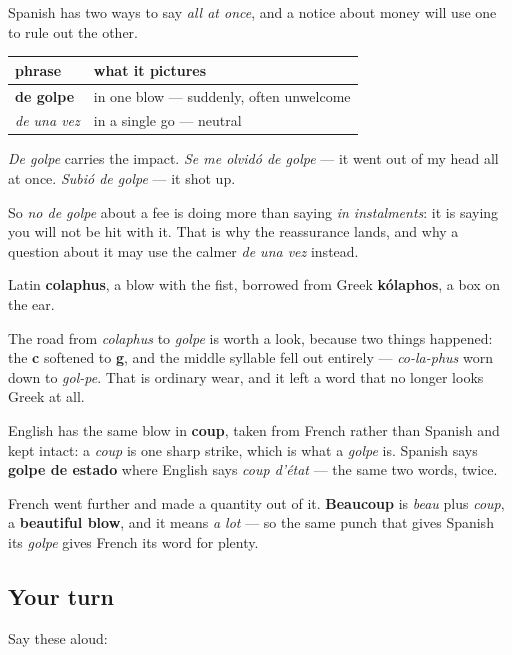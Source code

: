 \begin{grammarlens}[title={Grammar Lens: the phrase a payment plan is defined against}]
Spanish has two ways to say \emph{all at once}, and a notice about money will use one to rule out the other.

\noindent
\begin{tabularx}{\linewidth}{@{}>{\raggedright\arraybackslash}X>{\raggedright\arraybackslash}X@{}}
\toprule
\textbf{phrase} & \textbf{what it pictures} \\
\midrule
\textbf{de golpe} & in one blow — suddenly, often unwelcome \\
\emph{de una vez} & in a single go — neutral \\
\bottomrule
\end{tabularx}

\emph{De golpe} carries the impact. \emph{Se me olvidó de golpe} — it went out of my head all at once. \emph{Subió de golpe} — it shot up.

So \emph{no de golpe} about a fee is doing more than saying \emph{in instalments}: it is saying you will not be hit with it. That is why the reassurance lands, and why a question about it may use the calmer \emph{de una vez} instead.
\end{grammarlens}

\begin{cousinweb}
Latin \textbf{colaphus}, a blow with the fist, borrowed from Greek \textbf{kólaphos}, a box on the ear.

The road from \emph{colaphus} to \emph{golpe} is worth a look, because two things happened: the \textbf{c} softened to \textbf{g}, and the middle syllable fell out entirely — \emph{co-la-phus} worn down to \emph{gol-pe}. That is ordinary wear, and it left a word that no longer looks Greek at all.

English has the same blow in \textbf{coup}, taken from French rather than Spanish and kept intact: a \emph{coup} is one sharp strike, which is what a \emph{golpe} is. Spanish says \textbf{golpe de estado} where English says \emph{coup d'état} — the same two words, twice.

French went further and made a quantity out of it. \textbf{Beaucoup} is \emph{beau} plus \emph{coup}, a \textbf{beautiful blow}, and it means \emph{a lot} — so the same punch that gives Spanish its \emph{golpe} gives French its word for plenty.
\end{cousinweb}

\subsection*{Your turn}
Say these aloud:

